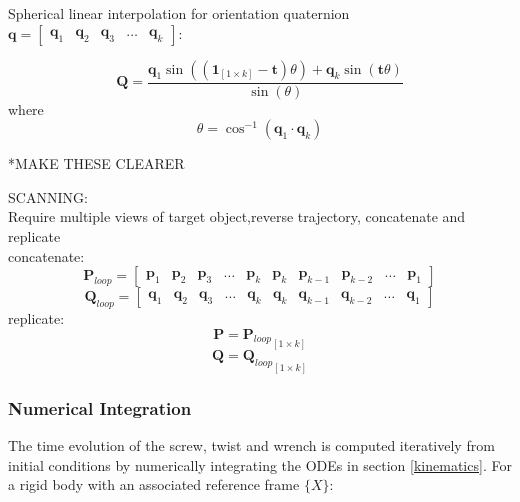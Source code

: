 Spherical linear interpolation for orientation quaternion $\mathbf{q}= \begin{bmatrix}
													\mathbf{q}_1 & \mathbf{q}_2 & \mathbf{q}_3 & \dots & \mathbf{q}_k
												\end{bmatrix}$:

\begin{equation} \label{slerp}
	\mathbf{Q} = \frac{\mathbf{q}_1\sin((\mathbf{1}_{[1 \times k]}-\mathbf{t})\theta) + \mathbf{q}_k\sin(\mathbf{t}\theta)}{\sin(\theta)}
\end{equation}
where
\begin{equation}
	\theta = \cos^{-1}(\mathbf{q}_1 \cdot \mathbf{q}_k)
\end{equation}

*MAKE THESE CLEARER

SCANNING:\\
Require multiple views of target object,reverse trajectory, concatenate and replicate\\
concatenate:\\
\begin{equation}
	\mathbf{P}_{loop}= 
	\begin{bmatrix}
		\mathbf{p}_1 & \mathbf{p}_2 & \mathbf{p}_3 & \dots & \mathbf{p}_k &
		\mathbf{p}_{k} & \mathbf{p}_{k-1} & \mathbf{p}_{k-2} & \dots & \mathbf{p}_1
	\end{bmatrix}
\end{equation}
\begin{equation}
	\mathbf{Q}_{loop}= 
	\begin{bmatrix}
		\mathbf{q}_1 & \mathbf{q}_2 & \mathbf{q}_3 & \dots & \mathbf{q}_k &
		\mathbf{q}_{k} & \mathbf{q}_{k-1} & \mathbf{q}_{k-2} & \dots & \mathbf{q}_1
	\end{bmatrix}
\end{equation}
replicate:
\begin{equation}
	\mathbf{P} = {\mathbf{P}_{loop}}_{[1 \times k]}
\end{equation}
\begin{equation}
	\mathbf{Q} = {\mathbf{Q}_{loop}}_{[1 \times k]}
\end{equation}



\subsubsection{Numerical Integration} \label{integration}
The time evolution of the screw, twist and wrench is computed iteratively from initial conditions by numerically integrating the ODEs in section \ref{kinematics}. For a rigid body with an associated reference frame $\{X\}$:

